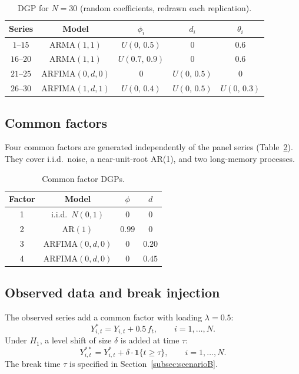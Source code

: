 \documentclass[12pt]{article}
\begin{document}
\begin{table}[h]
\centering
\caption{DGP for $N=30$ (random coefficients, redrawn each replication).}
\label{tab:N30}
\begin{tabular}{ccccc}
\toprule
Series & Model & $\phi_i$ & $d_i$ & $\theta_i$ \\
\midrule
$1$--$15$  & ARMA$(1,1)$     & $U(0,\,0.5)$   & $0$            & $0.6$ \\
$16$--$20$ & ARMA$(1,1)$     & $U(0.7,\,0.9)$ & $0$            & $0.6$ \\
$21$--$25$ & ARFIMA$(0,d,0)$ & $0$            & $U(0,\,0.5)$   & $0$   \\
$26$--$30$ & ARFIMA$(1,d,1)$ & $U(0,\,0.4)$   & $U(0,\,0.5)$   & $U(0,\,0.3)$ \\
\bottomrule
\end{tabular}
\end{table}

\subsection{Common factors}

Four common factors are generated independently of the panel series
(Table~\ref{tab:factors}). They cover i.i.d.\ noise, a near-unit-root AR(1),
and two long-memory processes.

\begin{table}[h]
\centering
\caption{Common factor DGPs.}
\label{tab:factors}
\begin{tabular}{cccc}
\toprule
Factor & Model & $\phi$ & $d$ \\
\midrule
1 & i.i.d.\ $N(0,1)$  & $0$    & $0$    \\
2 & AR$(1)$           & $0.99$ & $0$    \\
3 & ARFIMA$(0,d,0)$   & $0$    & $0.20$ \\
4 & ARFIMA$(0,d,0)$   & $0$    & $0.45$ \\
\bottomrule
\end{tabular}
\end{table}

\subsection{Observed data and break injection}

The observed series add a common factor with loading $\lambda = 0.5$:
\begin{equation}
Y^{*}_{i,t} = Y_{i,t} + 0.5\,f_t, \qquad i=1,\dots,N.
\label{eq:factorload}
\end{equation}
Under $H_1$, a level shift of size $\delta$ is added at time $\tau$:
\begin{equation}
Y^{**}_{i,t} = Y^{*}_{i,t} + \delta \cdot \mathbf{1}\{t \ge \tau\},
\qquad i=1,\dots,N.
\label{eq:break}
\end{equation}
The break time $\tau$ is specified in Section~\ref{subsec:scenarioB}.
\end{document}
